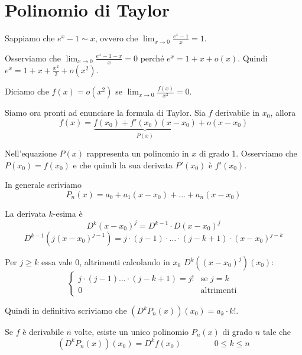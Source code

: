 \section{Polinomio di Taylor}

Sappiamo che $e^x-1 \sim x$, ovvero che $\lim_{x \to 0} \frac{e^x-1}{x} = 1$.

Osserviamo che $\lim_{x \to 0} \frac{e^x-1-x}{x} = 0$ perché $e^x=1+x+o(x)$. Quindi $e^x = 1 + x + \frac{x^2}{2} + o(x^2)$.

Diciamo che $f(x) = o(x^2)$ se $\lim_{x \to 0} \frac{f(x)}{x^2} = 0$.

Siamo ora pronti ad enunciare la formula di Taylor. Sia $f$ derivabile in $x_0$, allora
\begin{equation*}
f(x) = \underbrace{f(x_0) + f'(x_0)(x-x_0)}_{P(x)} + o(x-x_0)
\end{equation*}

Nell'equazione $P(x)$ rappresenta un polinomio in $x$ di grado 1. Osserviamo che $P(x_0) = f(x_0)$ e che quindi la sua derivata $P'(x_0)$ è $f'(x_0)$.

In generale scriviamo
\begin{equation*}
P_n (x) = a_0 + a_1 (x-x_0) + \ldots + a_n (x-x_0)
\end{equation*}

La derivata $k$-esima è
\begin{equation*}
D^k (x-x_0)^j = D^{k-1} \cdot D(x-{x_0})^j
\end{equation*}
\begin{equation*}
D^{k-1} (j(x-x_0)^{j-1}) = j \cdot (j-1) \cdot \ldots \cdot (j-k+1) \cdot (x-x_0)^{j-k}
\end{equation*}

Per $j \ge k$ essa vale 0, altrimenti calcolando in $x_0$ $D^k ((x-x_0)^j)(x_0)$:
\begin{equation*}
\begin{cases}
j \cdot (j-1) \ldots \cdot (j-k+1) = j! & \mbox{se } j = k \\
0 & \mbox{altrimenti}
\end{cases}
\end{equation*}

Quindi in definitiva scriviamo che $(D^k P_n(x)) (x_0) = a_k \cdot k!$.

Se $f$ è derivabile $n$ volte, esiste un unico polinomio $P_n(x)$ di grado $n$ tale che
\begin{equation*}
(D^k P_n(x)) (x_0) = D^k f(x_0) \qquad \qquad 0 \le k \le n
\end{equation*}


